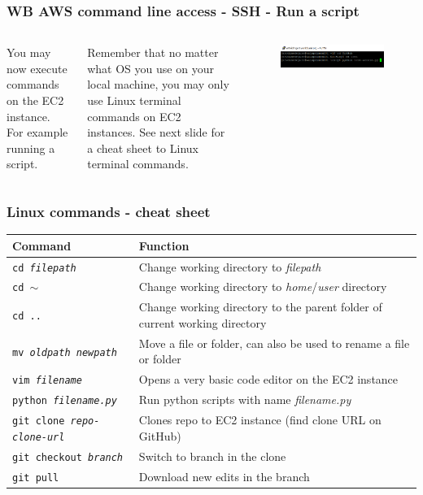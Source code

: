 \documentclass[aspectratio=169]{beamer} %
\begin{document}
\begin{frame}
	\frametitle{WB AWS command line access - SSH - Run a script}
	\vspace{1cm}
	\begin{columns}[c]
		You may now execute commands on the EC2 instance. 
		For example running a script.
		
		\vspace{.5cm}
		
		Remember that no matter what OS you use
		on your local machine, 
		you may only use Linux terminal commands on EC2 instances.
		See next slide for a cheat sheet to Linux terminal commands.
		
		\begin{figure}
			\centering
			\includegraphics[width=\textwidth]{./img/access-5.png}
		\end{figure}
	\end{columns}
\end{frame}

\begin{frame}
	\frametitle{Linux commands - cheat sheet}
	\vspace{-.6cm}
	\begin{table}
		\begin{tabular}{p{}p{}}
			Command & Function \\
			\hline \hline
			\texttt{cd \textit{filepath}}
			  & Change working directory to \textit{filepath}  \\
			\texttt{cd $\sim$}
			  & Change working directory to \textit{home}/\textit{user} directory \\
			\texttt{cd ..}
			  & Change working directory to the parent folder of current working directory \\
			\texttt{mv \textit{oldpath} \textit{newpath}}
			  & Move a file or folder, can also be used to rename a file or folder \\
			\texttt{vim \textit{filename}}
			  & Opens a very basic code editor on the EC2 instance \\
			\texttt{python \textit{filename.py}}
			  & Run python scripts with name \textit{filename.py} \\
			\texttt{git clone \textit{repo-clone-url}}
			  & Clones repo to EC2 instance (find clone URL on GitHub) \\
			\texttt{git checkout \textit{branch}}
			  & Switch to branch in the clone\\
			\texttt{git pull}
			  & Download new edits in the branch  \\
		\end{tabular}
	\end{table}
\end{frame}
\end{document}

